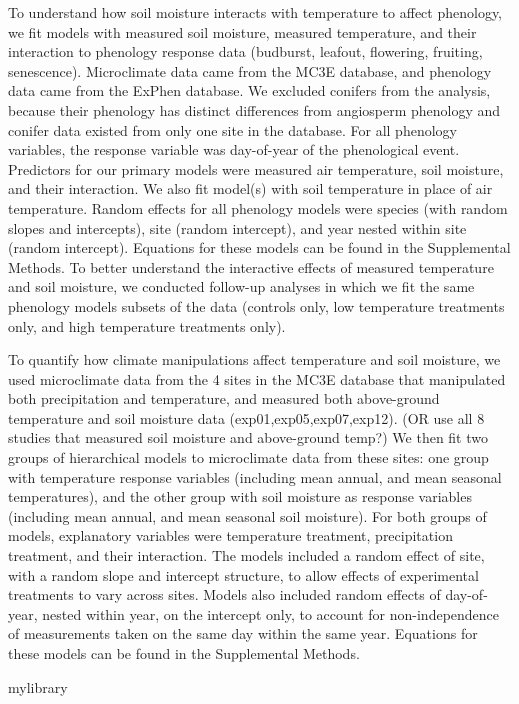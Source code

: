\documentclass{article}
\begin{document}
\par To understand how soil moisture interacts with temperature to affect phenology, we fit models with measured soil moisture, measured temperature, and their interaction to phenology response data (budburst, leafout, flowering, fruiting, senescence). Microclimate data came from the MC3E database, and phenology data came from the ExPhen database. We excluded conifers from the analysis, because their phenology has distinct differences from angiosperm phenology \cite{polgar2014} and conifer data existed from only one site in the database. For all phenology variables, the response variable was day-of-year of the phenological event. Predictors for our primary models were measured air temperature, soil moisture, and their interaction. We also fit model(s) with soil temperature in place of air temperature. Random effects for all phenology models were species (with random slopes and intercepts), site (random intercept), and year nested within site (random intercept). Equations for these models can be found in the Supplemental Methods. 
To better understand the interactive effects of measured temperature and soil moisture, we conducted follow-up analyses in which we fit the same phenology models subsets of the data (controls only, low temperature treatments only, and high temperature treatments only).
\par To quantify how climate manipulations affect temperature and soil moisture, we used microclimate data from the 4 sites in the MC3E database that manipulated both precipitation and temperature, and measured both above-ground temperature and soil moisture data (exp01,exp05,exp07,exp12). (OR use all 8 studies that measured soil moisture and above-ground temp?) We then fit two groups of hierarchical models to microclimate data from these sites: one group with temperature response variables (including mean annual, and mean seasonal temperatures), and the other group with soil moisture as response variables (including mean annual, and mean seasonal soil moisture). For both groups of models, explanatory variables were temperature treatment, precipitation treatment, and their interaction. The models included a random effect of site, with a random slope and intercept structure, to allow effects of experimental treatments to vary across sites. Models also included random effects of day-of-year, nested within year, on the intercept only, to account for non-independence of measurements taken on the same day within the same year. Equations for these models can be found in the Supplemental Methods. 

mylibrary
\end{document}
